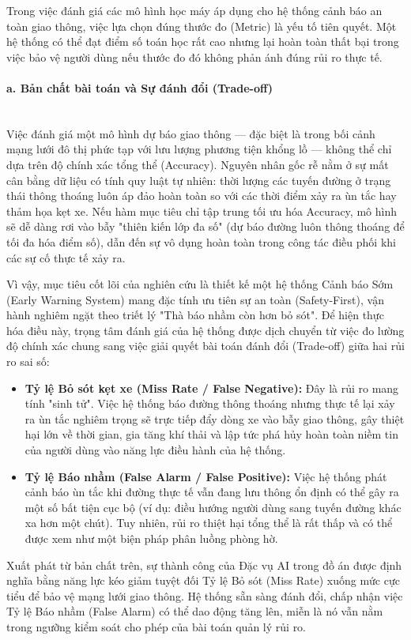 Trong việc đánh giá các mô hình học máy áp dụng cho hệ thống cảnh báo an toàn giao thông, việc lựa chọn đúng thước đo (Metric) là yếu tố tiên quyết. Một hệ thống có thể đạt điểm số toán học rất cao nhưng lại hoàn toàn thất bại trong việc bảo vệ người dùng nếu thước đo đó không phản ánh đúng rủi ro thực tế.

\paragraph{a. Bản chất bài toán và Sự đánh đổi (Trade-off)} \mbox{} \\
Việc đánh giá một mô hình dự báo giao thông — đặc biệt là trong bối cảnh mạng lưới đô thị phức tạp với lưu lượng phương tiện khổng lồ — không thể chỉ dựa trên độ chính xác tổng thể (Accuracy). Nguyên nhân gốc rễ nằm ở sự mất cân bằng dữ liệu có tính quy luật tự nhiên: thời lượng các tuyến đường ở trạng thái thông thoáng luôn áp đảo hoàn toàn so với các thời điểm xảy ra ùn tắc hay thảm họa kẹt xe. Nếu hàm mục tiêu chỉ tập trung tối ưu hóa Accuracy, mô hình sẽ dễ dàng rơi vào bẫy "thiên kiến lớp đa số" (dự báo đường luôn thông thoáng để tối đa hóa điểm số), dẫn đến sự vô dụng hoàn toàn trong công tác điều phối khi các sự cố thực tế xảy ra.

Vì vậy, mục tiêu cốt lõi của nghiên cứu là thiết kế một hệ thống Cảnh báo Sớm (Early Warning System) mang đặc tính ưu tiên sự an toàn (Safety-First), vận hành nghiêm ngặt theo triết lý "Thà báo nhầm còn hơn bỏ sót". Để hiện thực hóa điều này, trọng tâm đánh giá của hệ thống được dịch chuyển từ việc đo lường độ chính xác chung sang việc giải quyết bài toán đánh đổi (Trade-off) giữa hai rủi ro sai số:
\begin{itemize}
    \item \textbf{Tỷ lệ Bỏ sót kẹt xe (Miss Rate / False Negative):} Đây là rủi ro mang tính "sinh tử". Việc hệ thống báo đường thông thoáng nhưng thực tế lại xảy ra ùn tắc nghiêm trọng sẽ trực tiếp đẩy dòng xe vào bẫy giao thông, gây thiệt hại lớn về thời gian, gia tăng khí thải và lập tức phá hủy hoàn toàn niềm tin của người dùng vào năng lực điều hành của hệ thống.
    \item \textbf{Tỷ lệ Báo nhầm (False Alarm / False Positive):} Việc hệ thống phát cảnh báo ùn tắc khi đường thực tế vẫn đang lưu thông ổn định có thể gây ra một số bất tiện cục bộ (ví dụ: điều hướng người dùng sang tuyến đường khác xa hơn một chút). Tuy nhiên, rủi ro thiệt hại tổng thể là rất thấp và có thể được xem như một biện pháp phân luồng phòng hờ.
\end{itemize}
Xuất phát từ bản chất trên, sự thành công của Đặc vụ AI trong đồ án được định nghĩa bằng năng lực kéo giảm tuyệt đối Tỷ lệ Bỏ sót (Miss Rate) xuống mức cực tiểu để bảo vệ mạng lưới giao thông. Hệ thống sẵn sàng đánh đổi, chấp nhận việc Tỷ lệ Báo nhầm (False Alarm) có thể dao động tăng lên, miễn là nó vẫn nằm trong ngưỡng kiểm soát cho phép của bài toán quản lý rủi ro.

